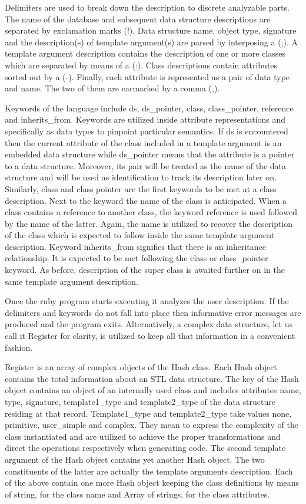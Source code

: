 \documentclass[pdftex, 11pt, a4paper]{report}
\begin{document}
\par
Delimiters are used to break down the description to discrete analyzable parts. The name of the database and subsequent data structure descriptions are separated by exclamation marks (!). Data structure name, object type, signature and the description(s) of template argument(s) are parsed by interposing a (;). A template argument description contains the description of one or more classes which are separated by means of a (:). Class descriptions contain attributes sorted out by a (-). Finally, each attribute is represented as a pair of data type and name. The two of them are earmarked by a comma (,).
\par
Keywords of the language include ds, ds\_pointer, class, class\_pointer, reference and inherits\_from. Keywords are utilized inside attribute representations and specifically as data types to pinpoint particular semantics. If ds is encountered then the current attribute of the class included in a template argument is an embedded data structure while ds\_pointer means that the attribute is a pointer to a data structure. Moreover, its pair will be treated as the name of the data structure and will be used as identification to track its description later on. Similarly, class and class pointer are the first keywords to be met at a class description. Next to the keyword the name of the class is anticipated. When a class contains a reference to another class, the keyword reference is used followed by the name of the latter. Again, the name is utilized to recover the description of the class which is expected to follow inside the same template argument description. Keyword inherits\_from signifies that there is an inheritance relationship. It is expected to be met following the class or class\_pointer keyword. As before, description of the super class is awaited further on in the same template argument description.
\par
Once the ruby program starts executing it analyzes the user description. If the delimiters and keywords do not fall into place then informative error messages are produced and the program exits. Alternatively, a complex data structure, let us call it Register for clarity, is utilized to keep all that information in a convenient fashion. 
\par
Register is an array of complex objects of the Hash class. Each Hash object contains the total information about an STL data structure. The key of the Hash object contains an object of an internally used class and includes attributes name, type, signature, template1\_type and template2\_type of the data structure residing at that record. Template1\_type and template2\_type take values none, primitive, user\_simple and complex. They mean to express the complexity of the class instantiated and are utilized to achieve the proper transformations and direct the operations respectively when generating code. The second template argument of the Hash object contains yet another Hash object. The two constituents of the latter are actually the template arguments description. Each of the above contain one more Hash object keeping the class definitions by means of string, for the class name and Array of strings, for the class attributes.
\end{document}

